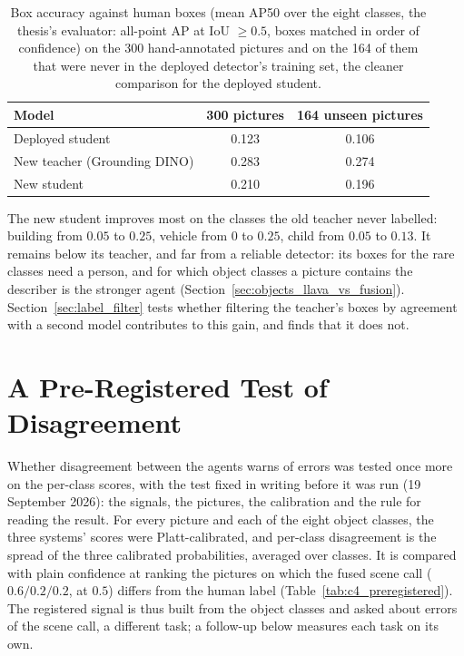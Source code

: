 \begin{table}[!htbp]
\centering
\caption[Box accuracy against human boxes]{Box accuracy against human boxes (mean AP50 over the eight classes, the thesis's evaluator: all-point AP at IoU $\ge 0.5$, boxes matched in order of confidence) on the 300 hand-annotated pictures and on the 164 of them that were never in the deployed detector's training set, the cleaner comparison for the deployed student.}
\label{tab:student_rebuild}
\begin{tabular}{lcc}
\toprule
Model & 300 pictures & 164 unseen pictures \\
\midrule
Deployed student & 0.123 & 0.106 \\
New teacher (Grounding DINO) & 0.283 & 0.274 \\
New student & 0.210 & 0.196 \\
\bottomrule
\end{tabular}
\end{table}

The new student improves most on the classes the old teacher never labelled: building from $0.05$ to $0.25$, vehicle from $0$ to $0.25$, child from $0.05$ to $0.13$. It remains below its teacher, and far from a reliable detector: its boxes for the rare classes need a person, and for which object classes a picture contains the describer is the stronger agent (Section~\ref{sec:objects_llava_vs_fusion}). Section~\ref{sec:label_filter} tests whether filtering the teacher's boxes by agreement with a second model contributes to this gain, and finds that it does not.

\section{A Pre-Registered Test of Disagreement}
\label{sec:c4_preregistered}

Whether disagreement between the agents warns of errors was tested once more on the per-class scores, with the test fixed in writing before it was run (19 September 2026): the signals, the pictures, the calibration and the rule for reading the result. For every picture and each of the eight object classes, the three systems' scores were Platt-calibrated, and per-class disagreement is the spread of the three calibrated probabilities, averaged over classes. It is compared with plain confidence at ranking the pictures on which the fused scene call ($0.6/0.2/0.2$, at $0.5$) differs from the human label (Table~\ref{tab:c4_preregistered}). The registered signal is thus built from the object classes and asked about errors of the scene call, a different task; a follow-up below measures each task on its own.

